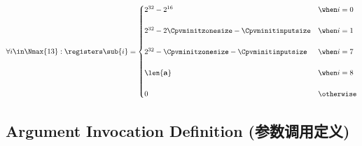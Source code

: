 \begin{equation}\label{eq:registers}
  \forall i \in \Nmax{13} : \registers\sub{i} = \begin{cases}
      2^{32} - 2^{16} &\when i = 0\\\\
      2^{32} - 2\Cpvminitzonesize - \Cpvminitinputsize &\when i = 1\\\\
      2^{32} - \Cpvminitzonesize - \Cpvminitinputsize &\when i = 7\\\\
      \len{\mathbf{a}}&\when i = 8\\\\
      0 &\otherwise
    \end{cases}
\end{equation}

\subsection{Argument Invocation Definition (参数调用定义)}

